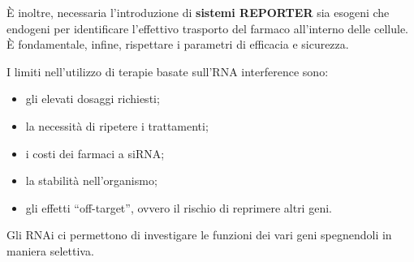 \documentclass[]{article}
\begin{document}
È inoltre, necessaria l'introduzione di \textbf{sistemi REPORTER} sia
esogeni che endogeni per identificare l'effettivo trasporto del farmaco
all'interno delle cellule. È fondamentale, infine, rispettare i
parametri di efficacia e sicurezza.

I limiti nell'utilizzo di terapie basate sull'RNA interference sono:

\begin{itemize}
\itemsep1pt\parskip0pt
\item
  gli elevati dosaggi richiesti;
\item
  la necessità di ripetere i trattamenti;
\item
  i costi dei farmaci a siRNA;
\item
  la stabilità nell'organismo;
\item
  gli effetti ``off-target'', ovvero il rischio di reprimere altri geni.
\end{itemize}

Gli RNAi ci permettono di investigare le funzioni dei vari geni
spegnendoli in maniera selettiva.
\end{document}
